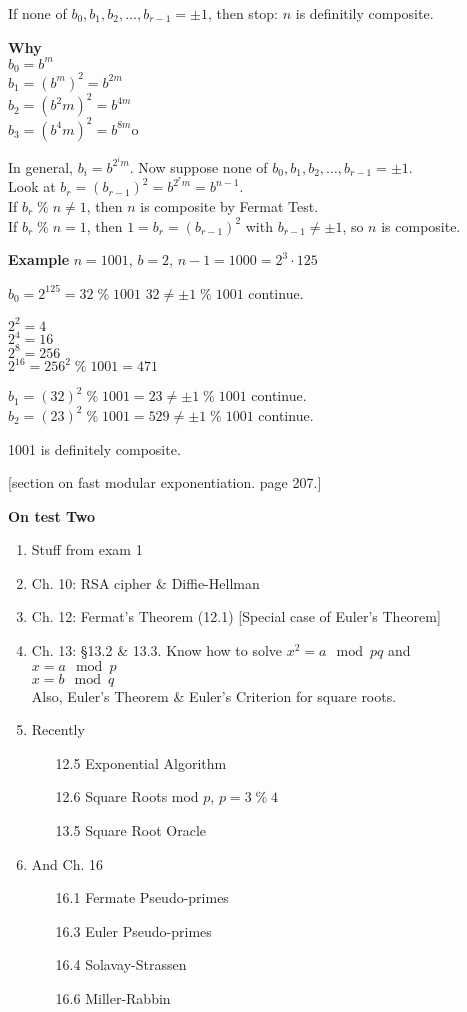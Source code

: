 If none of $b_0,b_1,b_2,\ldots,b_{r-1} = \pm 1$, then stop: $n$ is definitily composite.

\textbf{Why}\\
$b_0 = b^m$\\
$b_1 = (b^m)^2 = b^{2m}$\\
$b_2 = (b^2m)^2 = b^{4m}$\\
$b_3 = (b^4m)^2 = b^{8m}$o

In general, $b_i = b^{2^i m}$. Now suppose none of $b_0,b_1,b_2,\ldots,b_{r-1} = \pm 1$.\\
Look at $b_r = (b_{r-1})^2 = b^{2^r m} = b^{n-1}$.\\
If $b_r \;\%\; n \neq 1$, then $n$ is composite by Fermat Test.\\
If $b_r \;\%\; n = 1$, then $1 = b_r = (b_{r-1})^2$ with $b_{r-1} \neq \pm 1$, so $n$ is composite.

\textbf{Example} $n = 1001$, $b = 2$, $n-1 = 1000 = 2^3 \cdot 125$

$b_0 = 2^{125} = 32 \;\%\; 1001$ \quad $32 \neq \pm 1 \;\%\; 1001$ continue.

$2^2 = 4$\\
$2^4 = 16$\\
$2^8 = 256$\\
$2^16 = 256^2 \;\%\; 1001 = 471$

$b_1 = (32)^2 \;\%\; 1001 = 23 \neq \pm 1 \;\%\; 1001$ continue.\\
$b_2 = (23)^2 \;\%\; 1001 = 529 \neq \pm 1 \;\%\; 1001$ continue.

1001 is definitely composite.

[section on fast modular exponentiation. page 207.]

\textbf{On test Two}
\begin{enumerate}
\item Stuff from exam 1
\item Ch. 10: RSA cipher \& Diffie-Hellman
\item Ch. 12: Fermat's Theorem (12.1) [Special case of Euler's Theorem]
\item Ch. 13: \S 13.2 \& 13.3. Know how to solve $x^2 = a \mod pq$ and \\
$x = a \mod p$\\
$x = b \mod q$\\
Also, Euler's Theorem \& Euler's Criterion for square roots.
\item Recently
	\begin{enumerate}
	\item[12.5] Exponential Algorithm
	\item[12.6] Square Roots mod $p$, $p = 3 \;\%\; 4$
	\item[13.5] Square Root Oracle
	\end{enumerate}
\item And Ch. 16
	\begin{enumerate}
	\item[16.1] Fermate Pseudo-primes
	\item[16.3] Euler Pseudo-primes
	\item[16.4] Solavay-Strassen
	\item[16.6] Miller-Rabbin
	\end{enumerate}
\end{enumerate}

